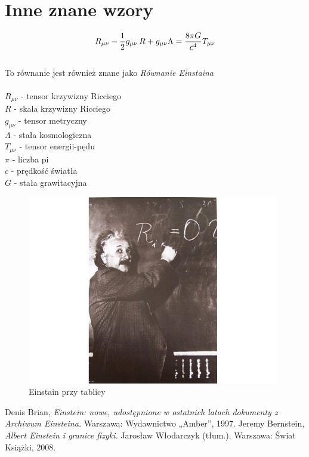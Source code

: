 \documentclass[11pt]{article}
\begin{document}
\section{Inne znane wzory}
$$R_{\mu \nu} - {1 \over 2}g_{\mu \nu}\,R + g_{\mu \nu} \Lambda = 
{8 \pi G \over c^4} T_{\mu \nu}$$\\To równanie jest również znane jako \textit{Równanie Einstaina}\\
\\$R_{\mu \nu}$ - tensor krzywizny Ricciego\\
$R$ - skala krzywizny Ricciego\\
$g_{\mu \nu}$ - tensor metryczny\\
$\Lambda$ - stała kosmologiczna\\
$T_{\mu \nu}$ - tensor energii-pędu\\
$\pi$ - liczba pi\\
$c$ - prędkość światła\\
$G$ - stała grawitacyjna
\begin{figure}[ht]
\begin{center}
\includegraphics[width=11cm]{122404_1}
\caption{Einstain przy tablicy}
\label{einstain_tablica}
\end{center}
\end{figure}
\newpage
\begin{thebibliography}{9}
Denis Brian,
\emph{Einstein: nowe, udostępnione w ostatnich latach dokumenty z Archiwum Einsteina.}
Warszawa: Wydawnictwo „Amber”, 1997.
Jeremy Bernstein, \emph{Albert Einstein i granice fizyki.} Jarosław Włodarczyk (tłum.). Warszawa: Świat Książki, 2008.
\end{thebibliography}
\end{document}
